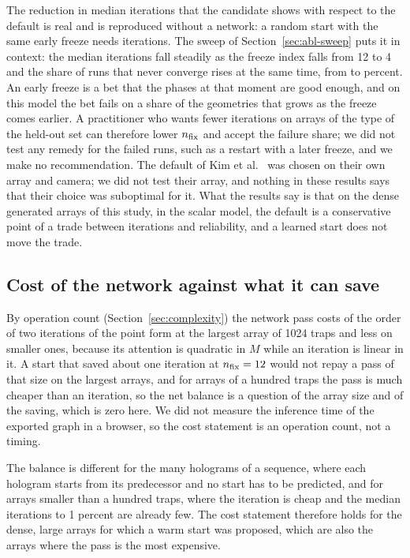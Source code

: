The reduction in median iterations that the candidate shows with respect to the default is real and is reproduced without a network: a random start with the same early freeze needs \itRThree{} iterations. The sweep of Section~\ref{sec:abl-sweep} puts it in context: the median iterations fall steadily as the freeze index falls from 12 to 4 and the share of runs that never converge rises at the same time, from \swTwelveNever{} to \swFourNever{} percent. An early freeze is a bet that the phases at that moment are good
enough, and on this model the bet fails on a share of the geometries that grows as the freeze comes earlier. A practitioner who wants fewer iterations on arrays of the type of the held-out set can therefore lower $n_{\mathrm{fix}}$ and accept the failure share; we did not test any remedy for the failed runs, such as a restart with a later freeze, and we make no recommendation. The default of Kim et al.~\cite{kim2019} was chosen on their own array and camera; we did not test their array, and nothing in these results says that their choice was suboptimal for it. What the results say
is that on the dense generated arrays of this study, in the scalar model, the default is a conservative point of a trade between iterations and reliability, and a learned start does not move the trade.

\subsection{Cost of the network against what it can save}\label{sec:cost}

By operation count (Section~\ref{sec:complexity}) the network pass costs of the order of two iterations of the point form at the largest array of 1024 traps and less on smaller ones, because its attention is quadratic in $M$ while an iteration is linear in it. A start that saved about one iteration at $n_{\mathrm{fix}}=12$ would not repay a pass of that size on the largest arrays, and for arrays of a hundred traps the pass is much cheaper than an iteration, so the net balance is a question of the array size and of the saving, which is zero here. We did not measure the inference time of the exported graph in a browser, so the cost statement is an operation count, not a timing.

The balance is different for the many holograms of a sequence, where each hologram starts from its predecessor and no start has to be predicted, and for arrays smaller than a hundred traps, where the iteration is cheap and the median iterations to 1 percent are already few. The cost statement therefore holds for the dense, large arrays for which a warm start was proposed, which are also the arrays where the pass is the most expensive.

